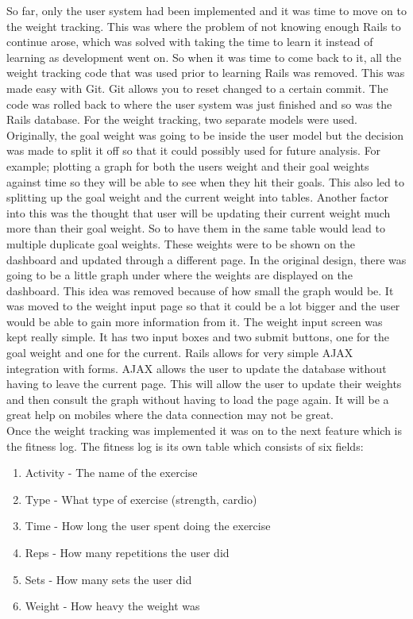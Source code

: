 So far, only the user system had been implemented and it was time to move on to the weight tracking. This was where the problem of not knowing enough Rails to continue arose, which was solved with taking the time to learn it instead of learning as development went on. So when it was time to come back to it, all the weight tracking code that was used prior to learning Rails was removed. This was made easy with Git. Git allows you to reset changed to a certain commit. The code was rolled back to where the user system was just finished and so was the Rails database. For the weight tracking, two separate models were used. Originally, the goal weight was going to be inside the user model but the decision was made to split it off so that it could possibly used for future analysis. For example; plotting a graph for both the users weight and their goal weights against time so they will be able to see when they hit their goals. This also led to splitting up the goal weight and the current weight into tables. Another factor into this was the thought that user will be updating their current weight much more than their goal weight. So to have them in the same table would lead to multiple duplicate goal weights. These weights were to be shown on the dashboard and updated through a different page. In the original design, there was going to be a little graph under where the weights are displayed on the dashboard. This idea was removed because of how small the graph would be. It was moved to the weight input page so that it could be a lot bigger and the user would be able to gain more information from it. The weight input screen was kept really simple. It has two input boxes and two submit buttons, one for the goal weight and one for the current. Rails allows for very simple AJAX integration with forms. AJAX allows the user to update the database without having to leave the current page. This will allow the user to update their weights and then consult the graph without having to load the page again. It will be a great help on mobiles where the data connection may not be great.\\

Once the weight tracking was implemented it was on to the next feature which is the fitness log. The fitness log is its own table which consists of six fields:

\begin{enumerate}
\item Activity - The name of the exercise
\item Type - What type of exercise (strength, cardio)
\item Time - How long the user spent doing the exercise
\item Reps - How many repetitions the user did
\item Sets - How many sets the user did
\item Weight - How heavy the weight was
\end{enumerate}

